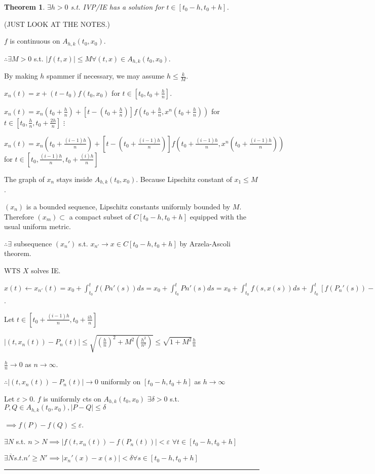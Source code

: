 \documentclass[twoside]{article}
\newcounter{lecnum}
\newcommand{\ep}{\varepsilon}
\newtheorem{theorem}{Theorem}[lecnum]
\newenvironment{proof}{{\bf Proof:}}{\hfill\rule{2mm}{2mm}}
\begin{document}
\begin{theorem}
    $\exists h > 0$ s.t. IVP/IE has a solution for $t \in [t_0-h, t_0+h]$.
\end{theorem}

\begin{proof}

    (JUST LOOK AT THE NOTES.)

    $f$ is continuous on $A_{h,k}(t_0,x_0)$.

    $\therefore \exists M > 0$ s.t. $|f(t,x)| \leq M \forall (t,x) \in A_{h,k}(t_0, x_0)$. 

    By making $h$ spammer if necessary, we may assume $h \leq \frac k M$.

    $x_n(t) = x + (t - t_0)f(t_0,x_0)$ for $t \in [t_0, t_0 + \frac h n]$. 

    $x_n(t) = x_n(t_0+\frac h n) + [t - (t_0 + \frac h n)]f(t_0 + \frac h n, x^n(t_0+\frac h n)) $ for $t \in [t_0, \frac h n, t_0 + \frac {2h}n]$
    $\vdots$

    $x_n(t) = x_n(t_0+\frac {(i-1)h} n) + [t - (t_0 + \frac {(i-1)h} n)]f(t_0 + \frac {(i-1)h} n, x^n(t_0+\frac {(i-1)h} n)) $ for $t \in [t_0, \frac {(i-1)h} n, t_0 + \frac {{(i)h}}n]$

    The graph of $x_n$ stays inside $A_{h,k}(t_0, x_0)$. Because Lipschitz constant of $x_1 \leq M$. 

    $(x_n)$ is a bounded sequence, Lipschitz constants uniformly bounded by $M$. Therefore $(x_m) \subset $ a compact subset of $C[t_0-h,t_0+h]$ equipped with the usual uniform metric.  

    $\therefore \exists $ subsequence $(x_n')$ s.t. $x_{n'} \rightarrow x \in C[t_0 - h, t_0+h]$ by Arzela-Ascoli theorem.

    WTS $X$ solves IE. 

    $x(t) \leftarrow x_{n'}(t) = x_0 + \int_{t_0}^{t} f(Pn'(s)) ds = x_0 + \int_{t_0}^t Pn'(s) ds  = x_0 + \int_{t_0}^t f(s,x(s)) ds + \int_{t_0}^t [f(P_n'(s)) - f(s,x_{n'}(s))] + \int_{t_0}^t [f(s,x_{n'}(s)) - f(s,x(s))] ds$. 

    Let $t \in [t_0 + \frac{(i-1)h}{n}, t_0 + \frac {ih}{n}]$

    $|(t,x_n(t)) - P_n(t)| \leq \sqrt{ (\frac h n)^2 + M^2(\frac{h^2}{n^2}) } \leq \sqrt{1+M^2}\frac h n$ 
    
    $\frac h n \rightarrow 0 $ as $n \rightarrow \infty$. 

    $\therefore |(t, x_n(t)) - P_n(t)| \rightarrow 0$ uniformly on $[t_0-h, t_0+h]$ as $h \rightarrow \infty$

    Let $\ep > 0$. $f$ is uniformly cts on $A_{h,k}(t_0, x_0)$ $\exists \delta > 0 $ s.t. $P, Q \in A_{h,k}(t_0, x_0) , |P-Q| \leq  \delta$

    $\implies f(P) - f(Q) \leq \ep$.

    $\exists N$ s.t. $n > N \implies |f(t, x_n(t)) - f(P_n(t))| < \ep$ $\forall t \in [t_0 - h, t_0 + h]$

    $\exists \overline N s.t. n' \geq N' \implies |x_n'(x) - x(s)| < \delta \forall s \in [t_0-h, t_0+h]$

\end{proof}
\end{document}
